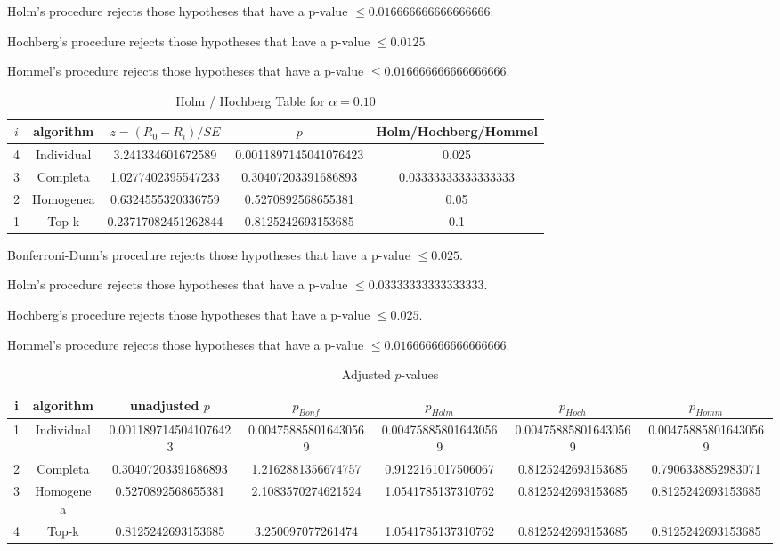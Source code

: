 \documentclass[a4paper,10pt]{article}
\begin{document}
\begin{landscape}
Holm's procedure rejects those hypotheses that have a p-value $\le0.016666666666666666$.


Hochberg's procedure rejects those hypotheses that have a p-value $\le0.0125$.


Hommel's procedure rejects those hypotheses that have a p-value $\le0.016666666666666666$.


\begin{table}[!htp]
\centering\tiny
\caption{Holm / Hochberg Table for $\alpha=0.10$}
\begin{tabular}{ccccc}
$i$&algorithm&$z=(R_0 - R_i)/SE$&$p$&Holm/Hochberg/Hommel\\
\hline
4&Individual&3.241334601672589&0.0011897145041076423&0.025\\
3&Completa&1.0277402395547233&0.30407203391686893&0.03333333333333333\\
2&Homogenea&0.6324555320336759&0.5270892568655381&0.05\\
1&Top-k&0.23717082451262844&0.8125242693153685&0.1\\
\hline
\end{tabular}
\end{table}
Bonferroni-Dunn's procedure rejects those hypotheses that have a p-value $\le0.025$.


Holm's procedure rejects those hypotheses that have a p-value $\le0.03333333333333333$.


Hochberg's procedure rejects those hypotheses that have a p-value $\le0.025$.


Hommel's procedure rejects those hypotheses that have a p-value $\le0.016666666666666666$.


\begin{table}[!htp]
\centering\tiny
\caption{Adjusted $p$-values}
\begin{tabular}{ccccccc}
i&algorithm&unadjusted $p$&$p_{Bonf}$&$p_{Holm}$&$p_{Hoch}$&$p_{Homm}$\\
\hline
1&Individual&0.0011897145041076423&0.004758858016430569&0.004758858016430569&0.004758858016430569&0.004758858016430569\\
2&Completa&0.30407203391686893&1.2162881356674757&0.9122161017506067&0.8125242693153685&0.7906338852983071\\
3&Homogenea&0.5270892568655381&2.1083570274621524&1.0541785137310762&0.8125242693153685&0.8125242693153685\\
4&Top-k&0.8125242693153685&3.250097077261474&1.0541785137310762&0.8125242693153685&0.8125242693153685\\
\hline
\end{tabular}
\end{table}


\end{landscape}
\end{document}
